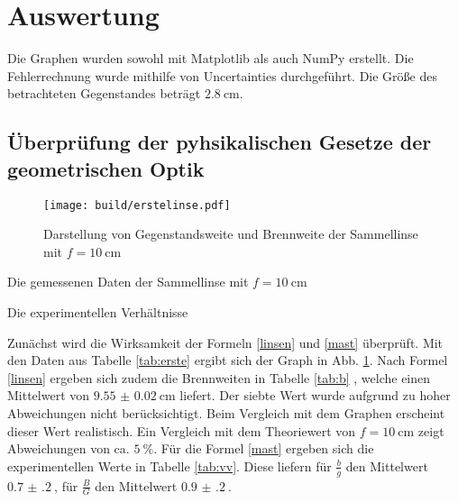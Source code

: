 \section{Auswertung}
\label{sec:Auswertung}


Die Graphen wurden sowohl mit Matplotlib \cite{matplotlib} als auch NumPy \cite{numpy} erstellt. Die
Fehlerrechnung wurde mithilfe von Uncertainties \cite{uncertainties} durchgeführt.
 Die Größe des betrachteten Gegenstandes beträgt $\SI{2.8}{\centi\meter}$.



\subsection{Überprüfung der pyhsikalischen Gesetze der geometrischen Optik}

\begin{figure}
 \centering
 \texttt{[image: build/erstelinse.pdf]}
 \caption{Darstellung von Gegenstandsweite und Brennweite der Sammellinse mit $f = \SI{10}{\centi\meter}$}
 \label{fig:erste}
\end{figure}

\begin{table}
	\centering
	\caption{Die gemessenen Daten der Sammellinse mit $f = \SI{10}{\centi\meter}$}
	
	\label{tab:b}
\end{table}

\begin{table}
	\centering
	\caption{Die experimentellen Verhältnisse}
	
	\label{tab:vv}
\end{table}

Zunächst wird die Wirksamkeit der Formeln \eqref{linsen} und \eqref{mast} überprüft.
Mit den Daten aus Tabelle \ref{tab:erste} ergibt sich der Graph in Abb. \ref{fig:erste}. Nach Formel \eqref{linsen} ergeben sich zudem die Brennweiten in Tabelle \ref{tab:b}
, welche einen Mittelwert von $\SI{9.55(2)}{\centi\meter}$ liefert. Der siebte Wert wurde aufgrund zu hoher Abweichungen nicht berücksichtigt. Beim Vergleich mit dem Graphen erscheint dieser Wert realistisch. Ein Vergleich mit dem Theoriewert von $f = \SI{10}{\centi\meter}$ zeigt Abweichungen von ca. $\SI{5}{\percent}$.
Für die Formel \eqref{mast} ergeben sich die experimentellen Werte in Tabelle \ref{tab:vv}. Diese liefern für $\frac{b}{g}$ den Mittelwert
$\SI{0.7(2)}{}$, für $\frac{B}{G}$ den Mittelwert $\SI{0.9(2)}{}$.




